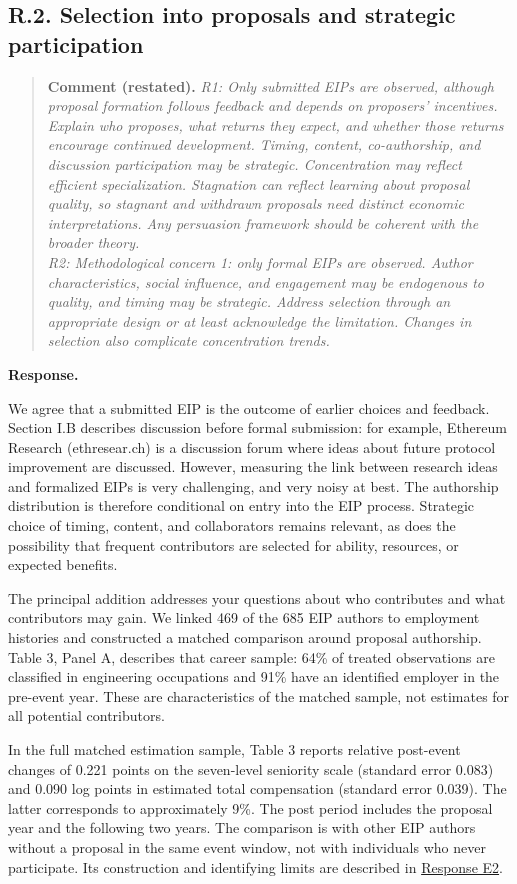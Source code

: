 \documentclass[11pt,letterpaper]{article}
\newcommand{\point}[3]{%
  \Needspace{7\baselineskip}
  \subsection*{#1. #2}\phantomsection\label{pt:#1}%
  \begin{quote}\small\textbf{Comment (restated).} \textit{#3}\end{quote}%
  \textbf{Response.}\enspace\ignorespaces}
\newcommand{\replyref}[1]{\hyperref[pt:#1]{Response #1}}
\begin{document}
\point{R.2}{Selection into proposals and strategic participation}{R1: Only submitted EIPs are observed, although proposal formation follows feedback and depends on proposers' incentives. Explain who proposes, what returns they expect, and whether those returns encourage continued development. Timing, content, co-authorship, and discussion participation may be strategic. Concentration may reflect efficient specialization. Stagnation can reflect learning about proposal quality, so stagnant and withdrawn proposals need distinct economic interpretations. Any persuasion framework should be coherent with the broader theory.\\
R2: Methodological concern 1: only formal EIPs are observed. Author characteristics, social influence, and engagement may be endogenous to quality, and timing may be strategic. Address selection through an appropriate design or at least acknowledge the limitation. Changes in selection also complicate concentration trends.}

We agree that a submitted EIP is the outcome of earlier choices and feedback. Section I.B describes discussion before formal submission: for example, Ethereum Research (ethresear.ch) is a discussion forum where ideas about future protocol improvement are discussed. However, measuring the link between research ideas and formalized EIPs is very challenging, and very noisy at best. The authorship distribution is therefore conditional on entry into the EIP process. Strategic choice of timing, content, and collaborators remains relevant, as does the possibility that frequent contributors are selected for ability, resources, or expected benefits.

The principal addition addresses your questions about who contributes and what contributors may gain. We linked 469 of the 685 EIP authors to employment histories and constructed a matched comparison around proposal authorship. Table 3, Panel A, describes that career sample: 64\% of treated observations are classified in engineering occupations and 91\% have an identified employer in the pre-event year. These are characteristics of the matched sample, not estimates for all potential contributors.

In the full matched estimation sample, Table 3 reports relative post-event changes of 0.221 points on the seven-level seniority scale (standard error 0.083) and 0.090 log points in estimated total compensation (standard error 0.039). The latter corresponds to approximately 9\%. The post period includes the proposal year and the following two years. The comparison is with other EIP authors without a proposal in the same event window, not with individuals who never participate. Its construction and identifying limits are described in \replyref{E2}.
\end{document}
